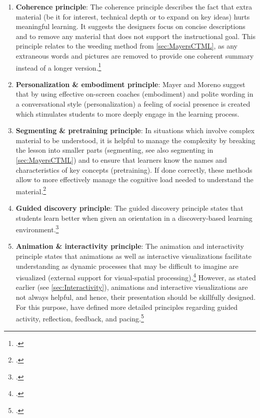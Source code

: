 \begin{enumerate}
    \item \textbf{Coherence principle}: The coherence principle describes the fact that extra material (be it for interest, technical depth or to expand on key ideas) hurts meaningful learning. It suggests the designers focus on concise descriptions and to remove any material that does not support the instructional goal. This principle relates to the weeding method from \ref{sec:MayersCTML}, as any extraneous words and pictures are removed to provide one coherent summary instead of a longer version.\footcites[Cf.][chapter 8, paragraphs 1 et seq]{ClarkElearningscienceinstruction2016}[cf.][p.6]{MayerMultimediaLearning2009}[cf.][p.22]{MayerAnimationAidMultimedia2001}
    \item \textbf{Personalization \& embodiment principle}: Mayer and Moreno suggest that by using effective on-screen coaches (embodiment) and polite wording in a conversational style (personalization) a feeling of social presence is created which stimulates students to more deeply engage in the learning process. 
    \item \textbf{Segmenting \& pretraining principle}: In situations which involve complex material to be understood, it is helpful to manage the complexity by breaking the lesson into smaller parts (segmenting, see also segmenting in \ref{sec:MayersCTML}) and to ensure that learners know the names and characteristics of key concepts (pretraining). If done correctly, these methods allow to more effectively manage the cognitive load needed to understand the material.\footcites[Cf.][chapters 9 and 10]{ClarkElearningscienceinstruction2016}
    \item \textbf{Guided discovery principle}: The guided discovery principle states that students learn better when given an orientation in a discovery-based learning environment.\footcites[Cf.][p.7]{MayerMultimediaLearning2009}
    \item \textbf{Animation \& interactivity principle}: The animation and interactivity principle states that animations as well as interactive visualizations facilitate understanding as dynamic processes that may be difficult to imagine are visualized (external support for visual-spatial processing).\footcites[Cf.][p.290]{Betrancourtanimationinteractivityprinciples2005}[cf.][p.81]{MunzerLearningmultimediapresentations2009}[cf.][p.19]{LeeScreenDesignGuidelines1999}[cf.][p.814]{MayerNineWaysReduce2003} However, as stated earlier (see \ref{sec:Interactivity}), animations and interactive visualizations are not always helpful, and hence, their presentation should be skillfully designed. For this purpose, \cite{MorenoInteractiveMultimodalLearning2007} have defined more detailed principles regarding guided activity, reflection, feedback, and pacing.\footcites[Cf.][p.292]{PatwardhanWhendoeshigher2015}[cf.][p.7]{MayerMultimediaLearning2009}[cf.][p.316]{MorenoInteractiveMultimodalLearning2007} %

\end{enumerate}
